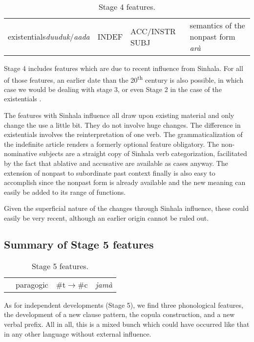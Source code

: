 \begin{table}[h!]
\centering
\begin{tabular}{p{2.5cm}p{2.5cm}p{2.5cm}p{2.5cm}} 
existentials\newline \emph{duuduk}/\emph{aada}&   INDEF  		&  ACC/INSTR SUBJ &   semantics of the nonpast form \emph{arà}  \\
\end{tabular}
\caption{Stage 4 features.} 
\end{table}

Stage 4 includes features which are due to recent influence from Sinhala. For all of those features, an earlier date than the 20\textsuperscript{th} century is also possible, in which case we would be dealing with stage 3, or even Stage 2 in the case of the existentials \citep{Nordhoff2012sinhalainfluence}.

The features with Sinhala influence all draw upon existing material and only change the use a little bit. They do not involve huge changes. The difference in existentials involves the reinterpretation of one verb. The grammaticalization of the indefinite article renders a formerly optional feature obligatory. The non-nominative subjects are a straight copy of Sinhala verb categorization, facilitated by the fact that ablative and accusative are available as cases anyway. The extension of nonpast to subordinate past context finally is also easy to accomplish since the nonpast form is already available and the new meaning can easily be added to its range of functions. 

Given the superficial nature of the changes through Sinhala influence, these could easily be very recent, although an earlier origin cannot be ruled out.


\subsection{Summary of Stage 5 features}

\begin{table}[h!]
\centering
\begin{tabular}{p{2cm}p{2cm}p{2cm}p{2cm}} 
\unJ 	  & paragogic \ng & \#t$\to$\#c 				& \emph{jamà}	 \\
\end{tabular}
\caption{Stage 5 features.} 
\end{table}

As for independent developments (Stage 5), we find three phonological features, the development of a new clause pattern, the copula construction, and a new verbal prefix. All in all, this  is a mixed bunch which could have occurred like that in any other language without external influence. 

